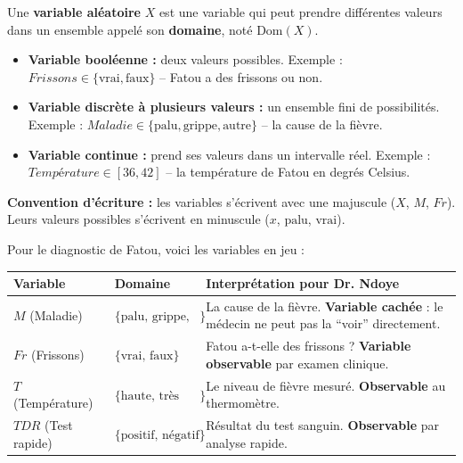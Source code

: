 \documentclass[11pt,a4paper]{article}
\begin{document}
\begin{definitionbox}
Une \textbf{variable aléatoire} $X$ est une variable qui peut prendre différentes valeurs dans un ensemble appelé son \textbf{domaine}, noté $\text{Dom}(X)$.

\begin{itemize}
    \item \textbf{Variable booléenne :} deux valeurs possibles. Exemple : $\textit{Frissons} \in \{\text{vrai}, \text{faux}\}$ -- Fatou a des frissons ou non.
    \item \textbf{Variable discrète à plusieurs valeurs :} un ensemble fini de possibilités. Exemple : $\textit{Maladie} \in \{\text{palu}, \text{grippe}, \text{autre}\}$ -- la cause de la fièvre.
    \item \textbf{Variable continue :} prend ses valeurs dans un intervalle réel. Exemple : $\textit{Température} \in [36, 42]$ -- la température de Fatou en degrés Celsius.
\end{itemize}

\textbf{Convention d'écriture :} les variables s'écrivent avec une majuscule ($X$, $M$, $Fr$). Leurs valeurs possibles s'écrivent en minuscule ($x$, $\text{palu}$, $\text{vrai}$).
\end{definitionbox}

Pour le diagnostic de Fatou, voici les variables en jeu :

\begin{center}
\begin{tabular}{llp{6.5cm}}
\toprule
\textbf{Variable} & \textbf{Domaine} & \textbf{Interprétation pour Dr. Ndoye} \\
\midrule
$M$ (Maladie) & $\{\text{palu, grippe, autre}\}$ & La cause de la fièvre. \textbf{Variable cachée} : le médecin ne peut pas la ``voir'' directement. \\
$Fr$ (Frissons) & $\{\text{vrai, faux}\}$ & Fatou a-t-elle des frissons ? \textbf{Variable observable} par examen clinique. \\
$T$ (Température) & $\{\text{haute, très haute}\}$ & Le niveau de fièvre mesuré. \textbf{Observable} au thermomètre. \\
$TDR$ (Test rapide) & $\{\text{positif, négatif}\}$ & Résultat du test sanguin. \textbf{Observable} par analyse rapide. \\
\bottomrule
\end{tabular}
\end{center}
\end{document}
